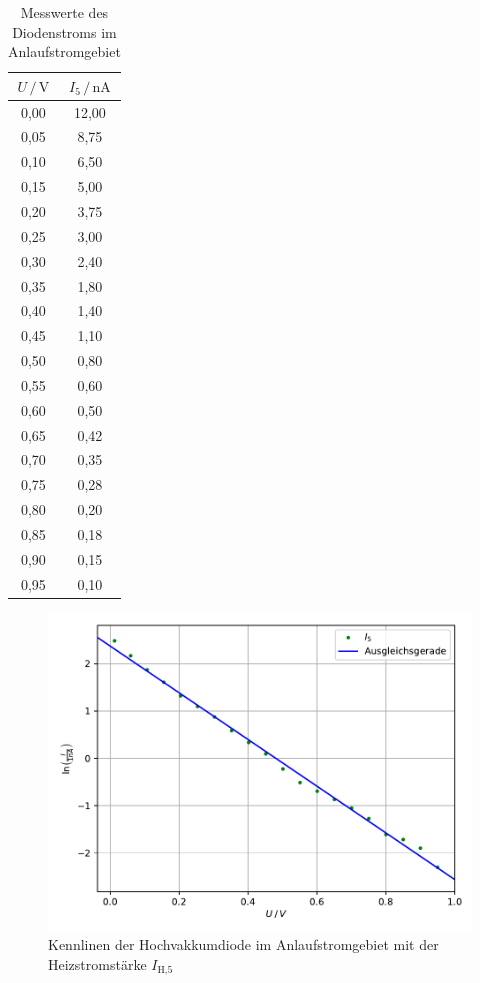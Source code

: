 \begin{table}
  \centering
  \caption{Messwerte des Diodenstroms im Anlaufstromgebiet}
  \label{tab:mess2}
  \begin{tabular}{c c}
  \toprule
  $ U \,/\, \si{\volt} $ & $I_5 \,/\, \si{\nano\ampere}$\\
  \midrule 
  0,00 & 12,00 \\
  0,05 &  8,75 \\
  0,10 &  6,50 \\
  0,15 &  5,00 \\
  0,20 &  3,75 \\
  0,25 &  3,00 \\
  0,30 &  2,40 \\
  0,35 &  1,80 \\
  0,40 &  1,40 \\
  0,45 &  1,10 \\
  0,50 &  0,80 \\
  0,55 &  0,60 \\
  0,60 &  0,50 \\
  0,65 &  0,42 \\
  0,70 &  0,35 \\
  0,75 &  0,28 \\
  0,80 &  0,20 \\
  0,85 &  0,18 \\
  0,90 &  0,15 \\
  0,95 &  0,10 \\
  \bottomrule
  \end{tabular}
  \end{table}

  \begin{figure} [H]
    \centering
    \includegraphics{content/plot3.pdf}
    \caption{Kennlinen der Hochvakkumdiode im Anlaufstromgebiet mit der Heizstromstärke $I_\text{H,5}$}
    \label{fig:plot3}
  \end{figure}

